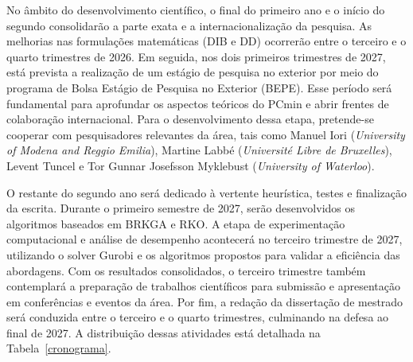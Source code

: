 \documentclass[11pt]{article}
\begin{document}
No âmbito do desenvolvimento científico, o final do primeiro ano e o início do segundo consolidarão a parte exata e a internacionalização da pesquisa. As melhorias nas formulações matemáticas (DIB e DD) ocorrerão entre o terceiro e o quarto trimestres de 2026. Em seguida, nos dois primeiros trimestres de 2027, está prevista a realização de um estágio de pesquisa no exterior por meio do programa de Bolsa Estágio de Pesquisa no Exterior (BEPE). Esse período será fundamental para aprofundar os aspectos teóricos do PCmin e abrir frentes de colaboração internacional. Para o desenvolvimento dessa etapa, pretende-se cooperar com pesquisadores relevantes da área, tais como Manuel Iori (\emph{University of Modena and Reggio Emilia}), Martine Labbé (\emph{Université Libre de Bruxelles}), Levent Tuncel e Tor Gunnar Josefsson Myklebust (\emph{University of Waterloo}).

O restante do segundo ano será dedicado à vertente heurística, testes e finalização da escrita. Durante o primeiro semestre de 2027, serão desenvolvidos os algoritmos baseados em BRKGA e RKO. A etapa de experimentação computacional e análise de desempenho acontecerá no terceiro trimestre de 2027, utilizando o solver Gurobi e os algoritmos propostos para validar a eficiência das abordagens. Com os resultados consolidados, o terceiro trimestre também contemplará a preparação de trabalhos científicos para submissão e apresentação em conferências e eventos da área. Por fim, a redação da dissertação de mestrado será conduzida entre o terceiro e o quarto trimestres, culminando na defesa ao final de 2027. A distribuição dessas atividades está detalhada na Tabela~\ref{cronograma}.
\end{document}
